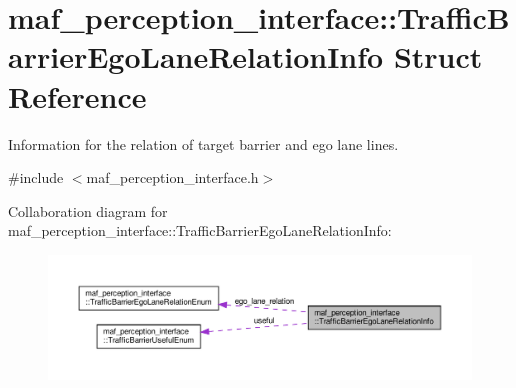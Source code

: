 \hypertarget{structmaf__perception__interface_1_1TrafficBarrierEgoLaneRelationInfo}{}\section{maf\+\_\+perception\+\_\+interface\+:\+:Traffic\+Barrier\+Ego\+Lane\+Relation\+Info Struct Reference}
\label{structmaf__perception__interface_1_1TrafficBarrierEgoLaneRelationInfo}


Information for the relation of target barrier and ego lane lines.  




{\ttfamily \#include $<$maf\+\_\+perception\+\_\+interface.\+h$>$}



Collaboration diagram for maf\+\_\+perception\+\_\+interface\+:\+:Traffic\+Barrier\+Ego\+Lane\+Relation\+Info\+:\nopagebreak
\begin{figure}[H]
\begin{center}
\leavevmode
\includegraphics[width=350pt]{structmaf__perception__interface_1_1TrafficBarrierEgoLaneRelationInfo__coll__graph}
\end{center}
\end{figure}
